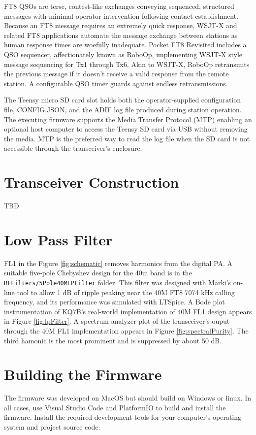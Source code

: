 \documentclass[10pt, letterpaper,]{article}
\begin{document}
FT8 QSOs are  terse, contest-like exchanges conveying sequenced,  structured messages with minimal operator intervention following contact establishment.
Because an FT8 message requires an extremely quick response, WSJT-X\cite{qexFT8} and related FT8 applications automate the message exchange between stations as human response times are woefully inadequate.
Pocket FT8 Revisited includes a QSO sequencer, affectionately known as RoboOp, implementing WSJT-X style message sequencing for Tx1 through Tx6.
Akin to WSJT-X, RoboOp retransmits the previous message if it doesn't receive a valid response from the remote station.
A configurable QSO timer guards against endless retransmissions.

The Teensy micro SD card slot holds both the operator-supplied configuration file, CONFIG.JSON, and the ADIF log file produced during station operation.
The executing firmware supports the Media Transfer Protocol\cite{mtp} (MTP) enabling an optional host computer to access the Teensy SD card via USB without removing the media.
MTP is  the preferred way to read the log file when the SD card is not accessible through the transceiver's enclosure.

\section*{Transceiver Construction}
TBD

\section*{Low Pass Filter}
FL1 in the Figure \ref{fig:schematic} removes harmonics from the digital PA.
A suitable five-pole Chebyshev design for the 40m band is in the \texttt{RFFilters/5Pole40MLPFilter} folder.
This filter was designed with Marki's on-line tool to allow 1 dB of ripple  peaking near the 40M FT8 7074 kHz calling frequency, and its performance was simulated with LTSpice.
A Bode plot instrumentation of KQ7B's real-world implementation of 40M FL1 design appears in Figure \ref{fig:lpFilter}.
A spectrum analyzer plot of the transceiver's ouput through the 40M FL1 implementation appears in Figure \ref{fig:spectralPurity}.
The third hamonic is the most prominent and is suppressed by about 50 dB.

\section*{Building the Firmware}
The firmware was developed on MacOS but should build on Windows or linux.  
In all cases, use Visual Studio Code and PlatformIO to build and install the firmware.
Install the required development tools for your computer's operating system and project source code:
\end{document}
